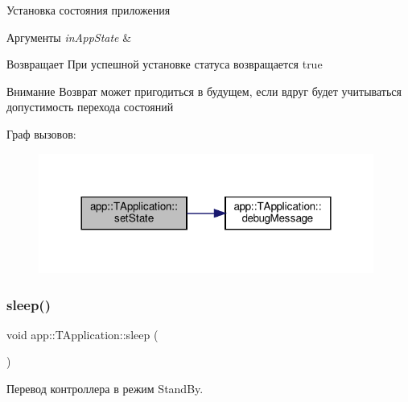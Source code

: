 Установка состояния приложения 


\begin{DoxyParams}{Аргументы}
{\em in\+App\+State} & \\
\hline
\end{DoxyParams}
\begin{DoxyReturn}{Возвращает}
При успешной установке статуса возвращается true 
\end{DoxyReturn}
\begin{DoxyAttention}{Внимание}
Возврат может пригодиться в будущем, если вдруг будет учитываться допустимость перехода состояний 
\end{DoxyAttention}
Граф вызовов\+:\nopagebreak
\begin{figure}[H]
\begin{center}
\leavevmode
\includegraphics[width=312pt]{classapp_1_1_t_application_a3df1835103a3ba338821c27ad05f9f8d_cgraph}
\end{center}
\end{figure}
\mbox{\label{classapp_1_1_t_application_ab44dd5aa2afe1d66b2588e908bfad4d0}} 
\subsubsection{\texorpdfstring{sleep()}{sleep()}}
{\footnotesize\ttfamily void app\+::\+T\+Application\+::sleep (\begin{DoxyParamCaption}{ }\end{DoxyParamCaption})}



Перевод контроллера в режим Stand\+By. 




